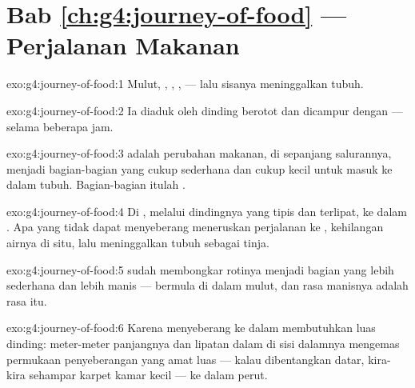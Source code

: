\section*{Bab \ref{ch:g4:journey-of-food} --- Perjalanan Makanan}

\begin{solution}{exo:g4:journey-of-food:1}
Mulut, , , ,  --- lalu sisanya
meninggalkan tubuh.
\end{solution}

\begin{solution}{exo:g4:journey-of-food:2}
Ia diaduk oleh dinding berotot  dan dicampur dengan  --- selama beberapa jam.
\end{solution}

\begin{solution}{exo:g4:journey-of-food:3}
 adalah perubahan makanan, di sepanjang salurannya, menjadi
bagian-bagian yang cukup sederhana dan cukup kecil untuk masuk ke
dalam tubuh. Bagian-bagian itulah .
\end{solution}

\begin{solution}{exo:g4:journey-of-food:4}
Di , melalui dindingnya yang tipis dan terlipat, ke dalam
. Apa yang tidak dapat menyeberang meneruskan perjalanan ke , kehilangan airnya di situ, lalu meninggalkan tubuh sebagai
tinja.
\end{solution}

\begin{solution}{exo:g4:journey-of-food:5}
 sudah membongkar rotinya menjadi bagian yang lebih sederhana
dan lebih manis ---  bermula di dalam mulut, dan rasa
manisnya adalah rasa  itu.
\end{solution}

\begin{solution}{exo:g4:journey-of-food:6}
Karena menyeberang ke dalam  membutuhkan luas dinding:
meter-meter panjangnya dan lipatan dalam di sisi dalamnya mengemas
permukaan penyeberangan yang amat luas --- kalau dibentangkan datar,
kira-kira sehampar karpet kamar kecil --- ke dalam perut.
\end{solution}

